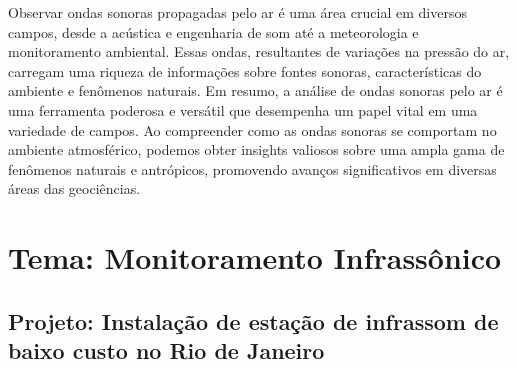 \documentclass[10pt,a4paper,oneside]{book}
\begin{document}
Observar ondas sonoras propagadas pelo ar é uma área crucial em diversos campos, desde a acústica e engenharia de som até a meteorologia e monitoramento ambiental. Essas ondas, resultantes de variações na pressão do ar, carregam uma riqueza de informações sobre fontes sonoras, características do ambiente e fenômenos naturais. Em resumo, a análise de ondas sonoras pelo ar é uma ferramenta poderosa e versátil que desempenha um papel vital em uma variedade de campos. Ao compreender como as ondas sonoras se comportam no ambiente atmosférico, podemos obter insights valiosos sobre uma ampla gama de fenômenos naturais e antrópicos, promovendo avanços significativos em diversas áreas das geociências.

\section{Tema: Monitoramento Infrassônico}

\subsection{Projeto: Instalação de estação de infrassom de baixo custo no Rio de Janeiro}
\end{document}
